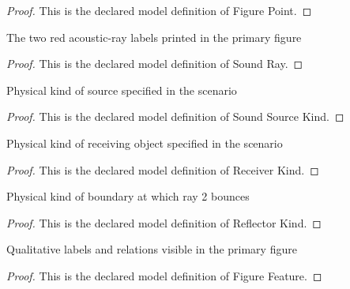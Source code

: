 \begin{proof}
  This is the declared model definition of Figure Point.
\end{proof}
\begin{definition}
  \label{def:physics:phyx-mini-0323:phyxminiproblems-problemphyxmini0323-soundray}
  The two red acoustic-ray labels printed in the primary figure
\end{definition}
\begin{proof}
  This is the declared model definition of Sound Ray.
\end{proof}
\begin{definition}
  \label{def:physics:phyx-mini-0323:phyxminiproblems-problemphyxmini0323-soundsourcekind}
  Physical kind of source specified in the scenario
\end{definition}
\begin{proof}
  This is the declared model definition of Sound Source Kind.
\end{proof}
\begin{definition}
  \label{def:physics:phyx-mini-0323:phyxminiproblems-problemphyxmini0323-receiverkind}
  Physical kind of receiving object specified in the scenario
\end{definition}
\begin{proof}
  This is the declared model definition of Receiver Kind.
\end{proof}
\begin{definition}
  \label{def:physics:phyx-mini-0323:phyxminiproblems-problemphyxmini0323-reflectorkind}
  Physical kind of boundary at which ray 2 bounces
\end{definition}
\begin{proof}
  This is the declared model definition of Reflector Kind.
\end{proof}
\begin{definition}
  \label{def:physics:phyx-mini-0323:phyxminiproblems-problemphyxmini0323-figurefeature}
  Qualitative labels and relations visible in the primary figure
\end{definition}
\begin{proof}
  This is the declared model definition of Figure Feature.
\end{proof}
